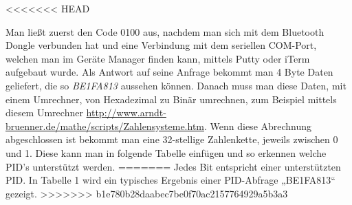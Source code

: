 <<<<<<< HEAD
\clearpage

Man ließt zuerst den Code 0100 aus, nachdem man sich mit dem Bluetooth Dongle verbunden hat und eine Verbindung mit dem seriellen COM-Port, welchen man im Geräte Manager finden kann, mittels Putty oder iTerm aufgebaut wurde.
Als Antwort auf seine Anfrage bekommt man 4 Byte Daten geliefert, die so \textit{BE1FA813} aussehen können. Danach muss man diese Daten, mit einem Umrechner, von Hexadezimal zu Binär umrechnen, zum Beispiel mittels diesem Umrechner \url{http://www.arndt-bruenner.de/mathe/scripts/Zahlensysteme.htm}. Wenn diese Abrechnung abgeschlossen ist bekommt man eine 32-stellige Zahlenkette, jeweils zwischen 0 und 1. 
Diese kann man in folgende Tabelle einfügen und so erkennen welche PID's unterstützt werden.
=======
Jedes Bit entspricht einer unterstützten PID. In Tabelle 1 wird ein typisches Ergebnis einer PID-Abfrage „BE1FA813“ gezeigt.
>>>>>>> b1e780b28daabec7be0f70ac2157764929a5b3a3

